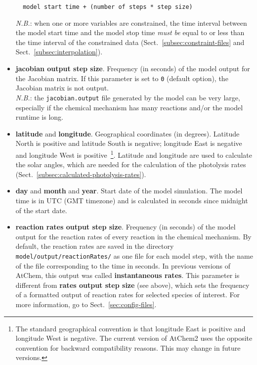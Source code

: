 \begin{itemize}
\begin{verbatim}
  model start time + (number of steps * step size)
  \end{verbatim}
  \emph{N.B.}: when one or more variables are constrained, the time
  interval between the model start time and the model stop time
  \emph{must be} equal to or less than the time interval of the
  constrained data (Sect.~\ref{subsec:constraint-files} and
  Sect.~\ref{subsec:interpolation}).
\item \textbf{jacobian output step size}. Frequency (in seconds) of
  the model output for the Jacobian matrix. If this parameter is set
  to \texttt{0} (default option), the Jacobian matrix is not
  output.\\
  \emph{N.B.}: the \texttt{jacobian.output} file generated by the
  model can be very large, especially if the chemical mechanism has
  many reactions and/or the model runtime is long.
\item \textbf{latitude} and \textbf{longitude}. Geographical
  coordinates (in degrees). Latitude North is positive and latitude
  South is negative; longitude East is negative and longitude West is
  positive~\footnote{The standard geographical convention is that
    longitude East is positive and longitude West is negative. The
    current version of AtChem2 uses the opposite convention for
    backward compatibility reasons. This may change in future
    versions.}. Latitude and longitude are used to calculate the solar
  angles, which are needed for the calculation of the photolysis rates
  (Sect.~\ref{subsec:calculated-photolysis-rates}).
\item \textbf{day} and \textbf{month} and \textbf{year}. Start date of
  the model simulation. The model time is in UTC (GMT timezone) and is
  calculated in seconds since midnight of the start date.
\item \textbf{reaction rates output step size}. Frequency (in seconds)
  of the model output for the reaction rates of every reaction in the
  chemical mechanism. By default, the reaction rates are saved in the
  directory \texttt{model/output/reactionRates/} as one file for each
  model step, with the name of the file corresponding to the time in
  seconds. In previous versions of AtChem, this output was called
  \textbf{instantaneous rates}. This parameter is different from
  \textbf{rates output step size} (see above), which sets the
  frequency of a formatted output of reaction rates for selected
  species of interest. For more information, go to
  Sect.~\ref{sec:config-files}.
\end{itemize}

